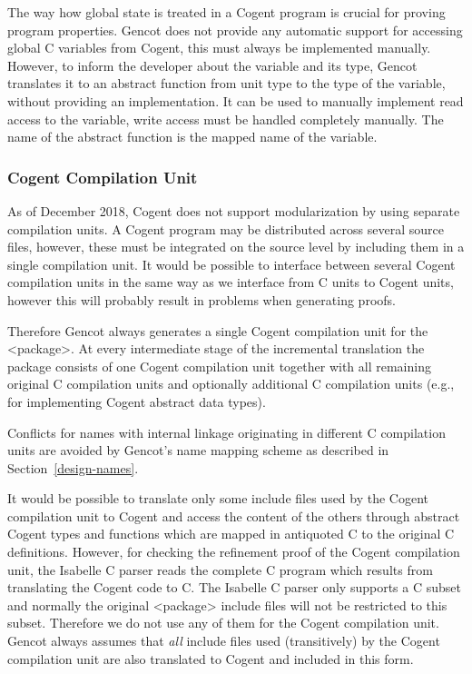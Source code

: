 The way how global state is treated in a Cogent program is crucial for proving program properties. Gencot does not 
provide any automatic support for accessing global C variables from Cogent, this must always be implemented manually. 
However, to inform the developer about the variable and its type, Gencot translates it to an abstract function
from unit type to the type of the variable, without providing an implementation. It can be used to manually implement 
read access to the variable, write access must be handled completely manually. The name of the abstract function is
the mapped name of the variable.

\subsubsection{Cogent Compilation Unit}

As of December 2018, Cogent does not support modularization by using separate compilation units. A Cogent program may be distributed
across several source files, however, these must be integrated on the source level by including them in a single compilation unit.
It would be possible to interface between several Cogent compilation units in the same way as we interface from C units to Cogent
units, however this will probably result in problems when generating proofs. 

Therefore Gencot always generates a single Cogent compilation unit for the <package>. 
At every intermediate stage of the incremental translation the package consists of one Cogent compilation unit 
together with all remaining original C compilation units and optionally additional C compilation units (e.g., for implementing 
Cogent abstract data types).

Conflicts for names with internal linkage originating in different C compilation units are avoided by Gencot's name mapping scheme
as described in Section~\ref{design-names}.

It would be possible to translate only some include files used by the Cogent compilation unit to Cogent and access the content
of the others through abstract Cogent types and functions which are mapped in antiquoted C to the original C definitions. 
However, for checking the refinement proof of the Cogent compilation unit, the Isabelle C parser reads the complete C program
which results from translating the Cogent code to C. The Isabelle C parser only supports a C subset and normally the original
<package> include files will not be restricted to this subset. Therefore we do not use any of them for the Cogent compilation
unit. Gencot always assumes that \textit{all} include files used (transitively) by the Cogent compilation unit are also translated
to Cogent and included in this form.

